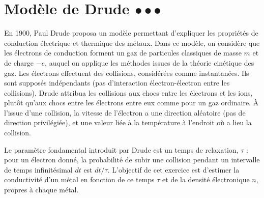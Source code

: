 \documentclass{report}
\begin{document}
\section*{Modèle de Drude $\bullet\bullet\bullet$}

En 1900, Paul Drude proposa un modèle permettant d'expliquer les propriétés de conduction électrique et thermique des métaux. Dans ce modèle, on considère que les électrons de conduction forment un gaz de particules classiques de masse $m$ et de charge $-e$, auquel on applique les méthodes issues de la théorie cinétique des gaz. Les électrons effectuent des collisions, considérées comme instantanées. Ils sont supposés indépendants (pas d'interaction électron-électron entre les collisions). Drude attribua les collisions aux chocs entre les électrons et les ions, plutôt qu'aux chocs entre les électrons entre eux comme pour un gaz ordinaire. À l'issue d'une collision, la vitesse de l'électron a une direction aléatoire (pas de direction privilégiée), et une valeur liée à la température à l'endroit où a lieu la collision.

\vspace{0,4cm}

Le paramètre fondamental introduit par Drude est un temps de relaxation, $\tau$ : pour un électron donné, la probabilité de subir une collision pendant un intervalle de temps infinitésimal $dt$ est $dt/\tau$. L'objectif de cet exercice est d'estimer la conductivité d'un métal en fonction de ce temps $\tau$ et de la densité électronique $n$, propres à chaque métal. 
\end{document}
